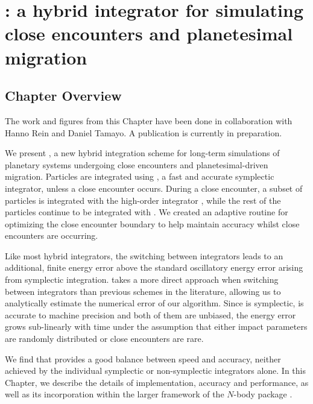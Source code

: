 \chapter[\hermes: A hybrid integrator]{\hermes: a hybrid integrator for simulating close encounters and planetesimal migration}
\label{chap:Hermes}

\section{Chapter Overview}
	\begin{center}
	\begin{minipage}[c]{4.75in}
	The work and figures from this Chapter have been done in collaboration with Hanno Rein and Daniel Tamayo. 
	A publication is currently in preparation. 
	\vspace{2em}
	\end{minipage}
	\end{center}

We present \hermes, a new hybrid integration scheme for long-term simulations of planetary systems undergoing close encounters and planetesimal-driven migration. 
Particles are integrated using \whfast, a fast and accurate symplectic integrator, unless a close encounter occurs.
During a close encounter, a subset of particles is integrated with the high-order integrator \ias, while the rest of the particles continue to be integrated with \whfast.
We created an adaptive routine for optimizing the close encounter boundary to help maintain accuracy whilst close encounters are occurring.

Like most hybrid integrators, the switching between integrators leads to an additional, finite energy error above the standard oscillatory energy error arising from symplectic integration.
\hermes takes a more direct approach when switching between integrators than previous schemes in the literature, allowing us to analytically estimate the numerical error of our algorithm. 
Since \whfast is symplectic, \ias is accurate to machine precision and both of them are unbiased, the energy error grows sub-linearly with time under the assumption that either impact parameters are randomly distributed or close encounters are rare.

We find that \hermes provides a good balance between speed and accuracy, neither achieved by the individual symplectic or non-symplectic integrators alone.
In this Chapter, we describe the details of implementation, accuracy and performance, as well as its incorporation within the larger framework of the $N$-body package \reb. 

